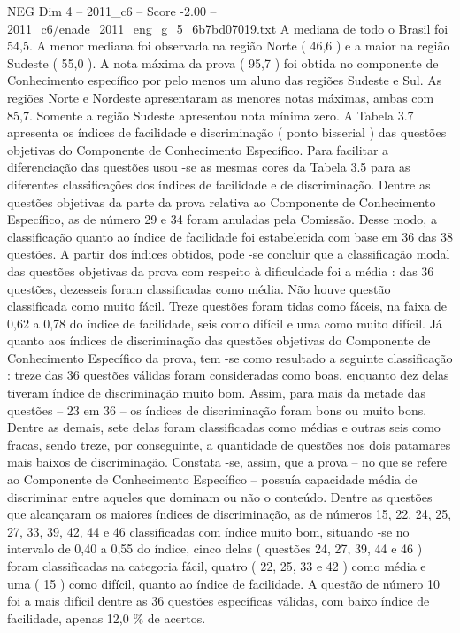 \begin{textsample}{NEG Dim 4 – 2011\_c6 – Score -2.00 – 2011\_c6/enade\_2011\_eng\_g\_5\_6b7bd07019.txt}
A mediana de todo o Brasil foi 54,5.
A menor mediana foi observada na região Norte ( 46,6 ) e a maior na região Sudeste ( 55,0 ).
A nota máxima da prova ( 95,7 ) foi obtida no componente de Conhecimento específico por pelo menos um aluno das regiões Sudeste e Sul.
As regiões Norte e Nordeste apresentaram as menores notas máximas, ambas com 85,7.
Somente a região Sudeste apresentou nota mínima zero.
A Tabela 3.7 apresenta os índices de facilidade e discriminação ( ponto bisserial ) das questões objetivas do Componente de Conhecimento Específico.
Para facilitar a diferenciação das questões usou -se as mesmas cores da Tabela 3.5 para as diferentes classificações dos índices de facilidade e de discriminação.
Dentre as questões objetivas da parte da prova relativa ao Componente de Conhecimento Específico, as de número 29 e 34 foram anuladas pela Comissão.
Desse modo, a classificação quanto ao índice de facilidade foi estabelecida com base em 36 das 38 questões.
A partir dos índices obtidos, pode -se concluir que a classificação modal das questões objetivas da prova com respeito à dificuldade foi a média : das 36 questões, dezesseis foram classificadas como média.
Não houve questão classificada como muito fácil.
Treze questões foram tidas como fáceis, na faixa de 0,62 a 0,78 do índice de facilidade, seis como difícil e uma como muito difícil.
Já quanto aos índices de discriminação das questões objetivas do Componente de Conhecimento Específico da prova, tem -se como resultado a seguinte classificação : treze das 36 questões válidas foram consideradas como boas, enquanto dez delas tiveram índice de discriminação muito bom.
Assim, para mais da metade das questões – 23 em 36 – os índices de discriminação foram bons ou muito bons.
Dentre as demais, sete delas foram classificadas como médias e outras seis como fracas, sendo treze, por conseguinte, a quantidade de questões nos dois patamares mais baixos de discriminação.
Constata -se, assim, que a prova – no que se refere ao Componente de Conhecimento Específico – possuía capacidade média de discriminar entre aqueles que dominam ou não o conteúdo.
Dentre as questões que alcançaram os maiores índices de discriminação, as de números 15, 22, 24, 25, 27, 33, 39, 42, 44 e 46 classificadas com índice muito bom, situando -se no intervalo de 0,40 a 0,55 do índice, cinco delas ( questões 24, 27, 39, 44 e 46 ) foram classificadas na categoria fácil, quatro ( 22, 25, 33 e 42 ) como média e uma ( 15 ) como difícil, quanto ao índice de facilidade.
A questão de número 10 foi a mais difícil dentre as 36 questões específicas válidas, com baixo índice de facilidade, apenas 12,0 \% de acertos.

\end{textsample}
